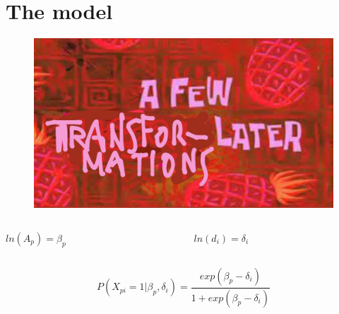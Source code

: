 \documentclass{beamer}
\begin{document}
\section{The model}
\begin{frame}
\begin{figure}
	\centering
	\includegraphics[width=0.5\linewidth]{later}
\end{figure}
\begin{columns}[T]
	\begin{column}{.5\linewidth}
		\centering
		$ln(A_p) = \beta_p$
	\end{column}
	\begin{column}{.5\linewidth}
	\centering
	$ln(d_i) = \delta_i$
\end{column}
\end{columns}

\vspace{3mm}
\begin{equation}
P(X_{pi} = 1|\beta_p, \delta_i) = \dfrac{exp(\beta_p - \delta_i)}{1 + exp(\beta_p - \delta_i)}
\end{equation}
\end{frame}
\end{document}
